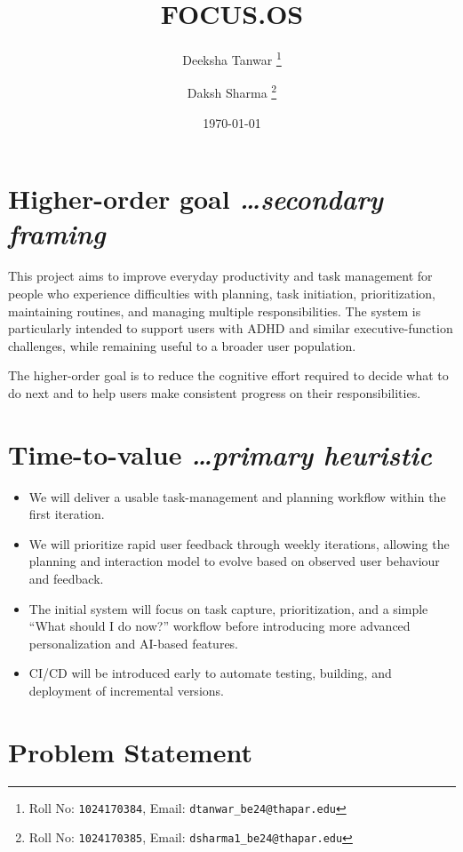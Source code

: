 \documentclass[11pt,a4paper]{article}
\title{FOCUS.OS}
\author{
  Deeksha Tanwar%
  \thanks{Roll No: \texttt{1024170384}, %
    Email: \texttt{dtanwar\_be24@thapar.edu}}
  \and
  Daksh Sharma%
  \thanks{Roll No: \texttt{1024170385}, %
    Email: \texttt{dsharma1\_be24@thapar.edu}}
}
\date{\today}
\newcommand{\BvrHint}[1]{%
  {\normalfont\normalsize\itshape\hfill #1}}
\begin{document}
\maketitle

\section{Higher-order goal%
  \BvrHint{\ldots secondary framing}}

This project aims to improve everyday productivity and task management for
people who experience difficulties with planning, task initiation,
prioritization, maintaining routines, and managing multiple responsibilities.
The system is particularly intended to support users with ADHD and similar
executive-function challenges, while remaining useful to a broader user
population.

The higher-order goal is to reduce the cognitive effort required to decide
what to do next and to help users make consistent progress on their
responsibilities.

\section{Time-to-value %
\BvrHint{\ldots primary heuristic}}

\begin{itemize}[leftmargin=0.7cm]
    \item We will deliver a usable task-management and planning workflow
    within the first iteration.
    
    \item We will prioritize rapid user feedback through weekly iterations,
    allowing the planning and interaction model to evolve based on observed
    user behaviour and feedback.
    
    \item The initial system will focus on task capture, prioritization, and
    a simple ``What should I do now?'' workflow before introducing more
    advanced personalization and AI-based features.
    
    \item CI/CD will be introduced early to automate testing, building, and
    deployment of incremental versions.
\end{itemize}

\section{Problem Statement}
\end{document}
